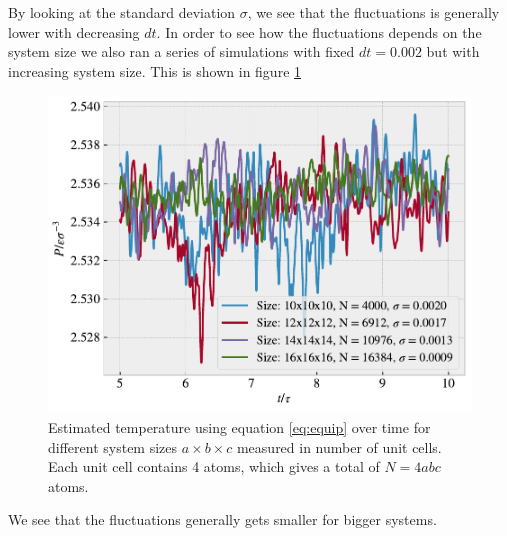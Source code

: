 \documentclass[reprint, amsmath, amssymb, aps]{revtex4-2}
\begin{document}
By looking at the standard deviation $\sigma$, we see that the fluctuations is generally lower with decreasing $dt$. In order to see how the fluctuations depends on the system size we also ran a series of simulations with fixed $dt = 0.002$ but with increasing system size. This is shown in figure \ref{fig:temp_size}
\begin{figure}[H]
  \includegraphics[width=\linewidth]{figures/temp_size.pdf}
  \caption{Estimated temperature using equation \ref{eq:equip} over time for different system sizes $a\times b\times c$ measured in number of unit cells. Each unit cell contains 4 atoms, which gives a total of $N = 4abc$ atoms.}
  \label{fig:temp_size}
\end{figure}
We see that the fluctuations generally gets smaller for bigger systems.
%
%
\end{document}

